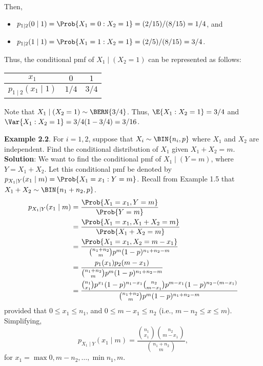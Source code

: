 \begin{Example}
\begin{center}
\begin{NiceTabular}{cc|ccc|c}
        \end{NiceTabular}
    \end{center}
    Then,
    \begin{itemize}
        \item $ p_{1\mid 2}(0\mid 1)=\Prob{X_1=0\given X_2=1}=(2/15)/(8/15)=1/4 $, and
        \item $ p_{1\mid 2}(1\mid 1)=\Prob{X_1=1\given X_2=1}=(2/5)/(8/15)=3/4 $.
    \end{itemize}
    Thus, the conditional pmf of $ X_1\mid(X_2=1) $ can be
    represented as follows:
    \begin{center}
        \begin{NiceTabular}{c|cc}
            $ x_1 $ & $ 0 $ & $ 1 $\\
            \midrule
            $ p_{1\mid 2}(x_1\mid 1) $ & $ 1/4 $ & $ 3/4 $
        \end{NiceTabular}
    \end{center}
    Note that $ X_1\mid (X_2=1)\sim \BERN{3/4} $. Thus, $ \E{X_1\given X_2=1}=3/4 $ and $ \Var{X_1\given X_2=1}=3/4(1-3/4)=3/16 $.
\end{Example}
\begin{Example}{}
    \textbf{Example 2.2}. For $ i=1,2 $, suppose that $ X_i \sim \BIN{n_i,p} $ where $ X_1 $ and $ X_2 $ are independent. Find the
    conditional distribution of $ X_1 $ given $ X_1+X_2=m $.
    \tcblower{}
    \textbf{Solution}: We want to find the conditional pmf of $ X_1\mid (Y=m) $, where $ Y=X_1+X_2 $. Let this conditional
    pmf be denoted by $ p_{X_1\mid Y}(x_1\mid m)=\Prob{X_1=x_1\given Y=m} $.
    Recall from Example 1.5 that $ X_1+X_2 \sim \BIN{n_1+n_2,p} $.
    \begin{align*}
        p_{X_1\mid Y}(x_1\mid m)
         & =\frac{\Prob{X_1=x_1,Y=m}}{\Prob{Y=m}}                                                                                               \\
         & =\frac{\Prob{X_1=x_1,X_1+X_2=m}}{\Prob{X_1+X_2=m}}                                                                                   \\
         & =\frac{\Prob{X_1=x_1,X_2=m-x_1}}{\binom{n_1+n_2}{m}p^m (1-p)^{n_1+n_2-m}}                                                            \\
         & =\frac{p_1(x_1)p_2(m-x_1)}{\binom{n_1+n_2}{m}p^m (1-p)^{n_1+n_2-m}}                                                                  \\
         & =\frac{\binom{n_1}{x_1}p^{x_1}(1-p)^{n_1-x_1}\binom{n_2}{m-x_1}p^{m-x_1}(1-p)^{n_2-(m-x_1)}}{\binom{n_1+n_2}{m}p^m(1-p)^{n_1+n_2-m}}
    \end{align*}
    provided that $ 0\le x_1\le n_1 $, and $ 0\le m-x_1\le n_2 $ (i.e., $ m-n_2\le x\le m $). Simplifying,
    \[p_{X_1\mid Y}(x_1\mid m)=\frac{\binom{n_1}{x_1}\binom{n_2}{m-x_1}}{\binom{n_1+n_2}{m}},\]
    for $ x_1=\max{0,m-n_2},\ldots,\min{n_1,m} $.
\end{Example}
